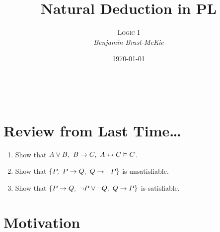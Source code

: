 \documentclass[a4paper, 11pt]{article} %
\title{\textbf{Natural Deduction in PL}} %
\author{\textsc{Logic I}\\ \em Benjamin Brast-McKie} %
\date{\today} %
\makeatletter
\renewcommand{\maketitle}{
\begin{flushright}
{\LARGE\@title}

\vspace{10pt}

{\@author}
\\ \@date
\end{flushright}

\vspace{-20pt}

}
\makeatother
\begin{document}
\maketitle %

\thispagestyle{empty}


\section*{Review from Last Time\ldots}

\begin{enumerate}
  \item Show that $A \vee B,\ B \rightarrow C,\ A \leftrightarrow C \vDash C$.
  \item Show that $\{P,\ P \rightarrow Q,\ Q \rightarrow \neg P\}$ is unsatisfiable. 
  \item Show that $\lbrace P \rightarrow Q,\ \neg P \vee \neg Q,\ Q \rightarrow P\rbrace$ is satisfiable.
\end{enumerate}





\section*{Motivation}
\end{document}
